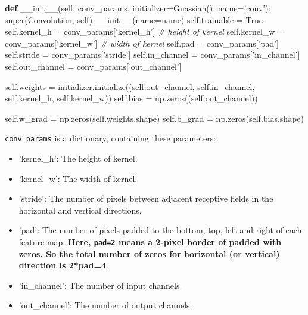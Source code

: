 \documentclass[11pt]{article}
\providecommand{\tightlist}{%
      \setlength{\itemsep}{0pt}\setlength{\parskip}{0pt}}
\newenvironment{Shaded}{}{}
\newcommand{\KeywordTok}[1]{\textcolor[rgb]{0.00,0.44,0.13}{\textbf{{#1}}}}
\newcommand{\StringTok}[1]{\textcolor[rgb]{0.25,0.44,0.63}{{#1}}}
\newcommand{\CommentTok}[1]{\textcolor[rgb]{0.38,0.63,0.69}{\textit{{#1}}}}
\newcommand{\FunctionTok}[1]{\textcolor[rgb]{0.02,0.16,0.49}{{#1}}}
\newcommand{\NormalTok}[1]{{#1}}
\newcommand{\VariableTok}[1]{\textcolor[rgb]{0.10,0.09,0.49}{{#1}}}
\newcommand{\OperatorTok}[1]{\textcolor[rgb]{0.40,0.40,0.40}{{#1}}}
\newcommand{\BuiltInTok}[1]{{#1}}
\begin{document}
\begin{Shaded}
\begin{Highlighting}[]

\KeywordTok{def} \FunctionTok{__init__}\NormalTok{(}\VariableTok{self}\NormalTok{, conv_params, initializer}\OperatorTok{=}\NormalTok{Guassian(), name}\OperatorTok{=}\StringTok{'conv'}\NormalTok{):}
        \BuiltInTok{super}\NormalTok{(Convolution, }\VariableTok{self}\NormalTok{).}\FunctionTok{__init__}\NormalTok{(name}\OperatorTok{=}\NormalTok{name)}
        \VariableTok{self}\NormalTok{.trainable }\OperatorTok{=} \VariableTok{True}
        \VariableTok{self}\NormalTok{.kernel_h }\OperatorTok{=}\NormalTok{ conv_params[}\StringTok{'kernel_h'}\NormalTok{] }\CommentTok{# height of kernel}
        \VariableTok{self}\NormalTok{.kernel_w }\OperatorTok{=}\NormalTok{ conv_params[}\StringTok{'kernel_w'}\NormalTok{] }\CommentTok{# width of kernel}
        \VariableTok{self}\NormalTok{.pad }\OperatorTok{=}\NormalTok{ conv_params[}\StringTok{'pad'}\NormalTok{]}
        \VariableTok{self}\NormalTok{.stride }\OperatorTok{=}\NormalTok{ conv_params[}\StringTok{'stride'}\NormalTok{]}
        \VariableTok{self}\NormalTok{.in_channel }\OperatorTok{=}\NormalTok{ conv_params[}\StringTok{'in_channel'}\NormalTok{]}
        \VariableTok{self}\NormalTok{.out_channel }\OperatorTok{=}\NormalTok{ conv_params[}\StringTok{'out_channel'}\NormalTok{]}

        \VariableTok{self}\NormalTok{.weights }\OperatorTok{=}\NormalTok{ initializer.initialize((}\VariableTok{self}\NormalTok{.out_channel, }\VariableTok{self}\NormalTok{.in_channel, }\VariableTok{self}\NormalTok{.kernel_h, }\VariableTok{self}\NormalTok{.kernel_w))}
        \VariableTok{self}\NormalTok{.bias }\OperatorTok{=}\NormalTok{ np.zeros((}\VariableTok{self}\NormalTok{.out_channel))}

        \VariableTok{self}\NormalTok{.w_grad }\OperatorTok{=}\NormalTok{ np.zeros(}\VariableTok{self}\NormalTok{.weights.shape)}
        \VariableTok{self}\NormalTok{.b_grad }\OperatorTok{=}\NormalTok{ np.zeros(}\VariableTok{self}\NormalTok{.bias.shape)}
\end{Highlighting}
\end{Shaded}

\texttt{conv\_params} is a dictionary, containing these parameters:

\begin{itemize}
\tightlist
\item
  'kernel\_h': The height of kernel.
\item
  'kernel\_w': The width of kernel.
\item
  'stride': The number of pixels between adjacent receptive fields in
  the horizontal and vertical directions.
\item
  'pad': The number of pixels padded to the bottom, top, left and right
  of each feature map. \textbf{Here, \texttt{pad=2} means a 2-pixel
  border of padded with zeros. So the total number of zeros for
  horizontal (or vertical) direction is 2*pad=4}.
\item
  'in\_channel': The number of input channels.
\item
  'out\_channel': The number of output channels.
\end{itemize}
\end{document}
